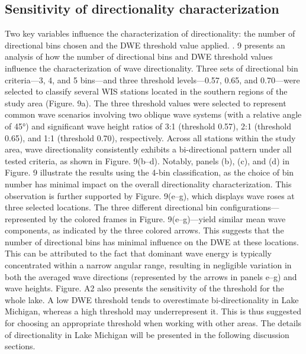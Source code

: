 \subsection{Sensitivity of directionality characterization}
\label{c3_Sensitivity of directionality characterization}
Two key variables influence the characterization of directionality: the number of directional bins chosen and the DWE threshold value applied. . 9 presents an analysis of how the number of directional bins and DWE threshold values influence the characterization of wave directionality. Three sets of directional bin criteria—3, 4, and 5 bins—and three threshold levels—0.57, 0.65, and 0.70—were selected to classify several WIS stations located in the southern regions of the study area (Figure. 9a). The three threshold values were selected to represent common wave scenarios involving two oblique wave systems (with a relative angle of 45°) and significant wave height ratios of 3:1 (threshold 0.57), 2:1 (threshold 0.65), and 1:1 (threshold 0.70), respectively. Across all stations within the study area, wave directionality consistently exhibits a bi-directional pattern under all tested criteria, as shown in Figure. 9(b–d). Notably, panels (b), (c), and (d) in Figure. 9 illustrate the results using the 4-bin classification, as the choice of bin number has minimal impact on the overall directionality characterization. This observation is further supported by Figure. 9(e–g), which displays wave roses at three selected locations. The three different directional bin configurations—represented by the colored frames in Figure. 9(e–g)—yield similar mean wave components, as indicated by the three colored arrows. This suggests that the number of directional bins has minimal influence on the DWE at these locations. This can be attributed to the fact that dominant wave energy is typically concentrated within a narrow angular range, resulting in negligible variation in both the averaged wave directions (represented by the arrows in panels e–g) and wave heights. Figure. A2 also presents the sensitivity of the threshold for the whole lake. A low DWE threshold tends to overestimate bi-directionality in Lake Michigan, whereas a high threshold may underrepresent it. This is thus suggested for choosing an appropriate threshold when working with other areas. The details of directionality in Lake Michigan will be presented in the following discussion sections.

